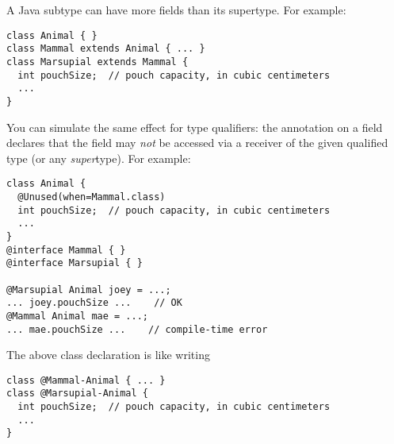 A Java subtype can have more fields than its supertype.  For example:

\begin{Verbatim}
class Animal { }
class Mammal extends Animal { ... }
class Marsupial extends Mammal {
  int pouchSize;  // pouch capacity, in cubic centimeters
  ...
}
\end{Verbatim}

You can simulate
the same effect for type qualifiers:  
the  annotation
on a field declares that the field may \emph{not} be accessed via a receiver of
the given qualified type (or any \emph{super}type).
For example:

\begin{Verbatim}
class Animal {
  @Unused(when=Mammal.class)
  int pouchSize;  // pouch capacity, in cubic centimeters
  ...
}
@interface Mammal { }
@interface Marsupial { }

@Marsupial Animal joey = ...;
... joey.pouchSize ...    // OK
@Mammal Animal mae = ...;
... mae.pouchSize ...    // compile-time error
\end{Verbatim}

The above class declaration is like writing

\begin{Verbatim}
class @Mammal-Animal { ... }
class @Marsupial-Animal {
  int pouchSize;  // pouch capacity, in cubic centimeters
  ...
}  
\end{Verbatim}


